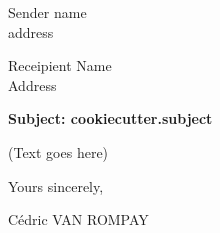 \documentclass[12pt]{article}
\begin{document}
\thispagestyle{empty}

\noindent

{
    Sender name\\
    address
}

\begin{flushright}
    Receipient Name\\
    Address
\end{flushright}

\vspace{3em}

\textbf{Subject: {{cookiecutter.subject}}}

(Text goes here)

Yours sincerely,

\begin{flushright}
    Cédric VAN ROMPAY
\end{flushright}



{}
\end{document}
